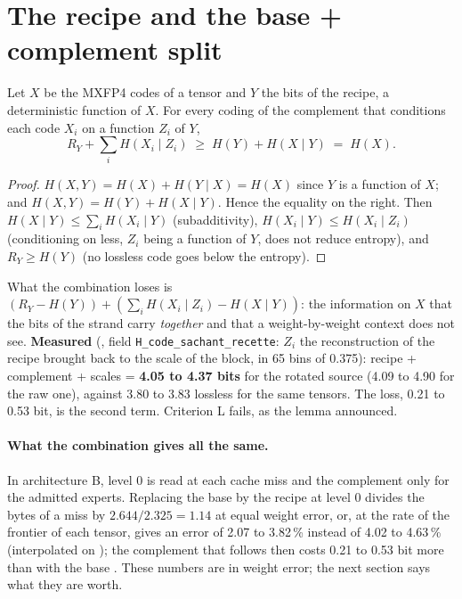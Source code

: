 \section{The recipe and the base + complement split}\label{t3gen:sec:complement}

\begin{lemme}\label{t3gen:lem:complement}
Let $X$ be the MXFP4 codes of a tensor and $Y$ the bits of the recipe, a deterministic function of $X$. For every coding of the complement that conditions each code $X_i$ on a function $Z_i$ of $Y$,
\begin{equation}\label{t3gen:eq:complement}
R_Y + \sum_i H(X_i \mid Z_i) \;\ge\; H(Y) + H(X \mid Y) \;=\; H(X).
\end{equation}
\end{lemme}

\begin{proof}
$H(X, Y) = H(X) + H(Y \mid X) = H(X)$ since $Y$ is a function of $X$; and $H(X, Y) = H(Y) + H(X \mid Y)$. Hence the equality on the right. Then $H(X \mid Y) \le \sum_i H(X_i \mid Y)$ (subadditivity), $H(X_i \mid Y) \le H(X_i \mid Z_i)$ (conditioning on less, $Z_i$ being a function of $Y$, does not reduce entropy), and $R_Y \ge H(Y)$ (no lossless code goes below the entropy).
\end{proof}

What the combination loses is $(R_Y - H(Y)) + (\sum_i H(X_i\mid Z_i) - H(X\mid Y))$: the information on $X$ that the bits of the strand carry \emph{together} and that a weight-by-weight context does not see. \textbf{Measured} (, field \texttt{H\_code\_sachant\_recette}: $Z_i$ the reconstruction of the recipe brought back to the scale of the block, in 65 bins of 0.375): recipe + complement + scales = \textbf{4.05 to 4.37 bits} for the rotated source (4.09 to 4.90 for the raw one), against 3.80 to 3.83 lossless for the same tensors. The loss, 0.21 to 0.53 bit, is the second term. Criterion L fails, as the lemma announced.

\paragraph{What the combination gives all the same.} In architecture B, level 0 is read at each cache miss and the complement only for the admitted experts. Replacing the base by the recipe at level 0 divides the bytes of a miss by $2.644/2.325 = 1.14$ at equal weight error, or, at the rate of the frontier of each tensor, gives an error of 2.07 to 3.82\,\% instead of 4.02 to 4.63\,\% (interpolated on ); the complement that follows then costs 0.21 to 0.53 bit more than with the base \calc. These numbers are in weight error; the next section says what they are worth.


